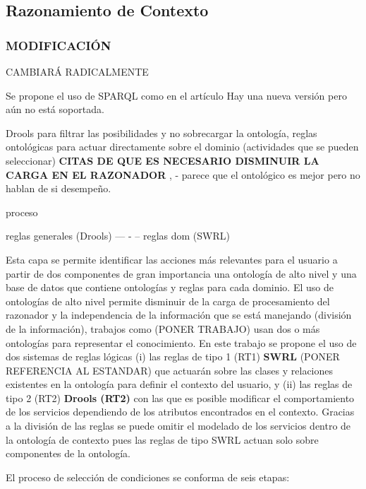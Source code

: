 \subsection{Razonamiento de Contexto}
\label{subsec:Prop_Razonamiento}


\subsubsection{MODIFICACIÓN}

CAMBIARÁ RADICALMENTE

Se propone el uso de SPARQL como en el artículo \cite{Meditskos2013, Meditskos2016}
Hay una nueva versión pero aún no está soportada.


Drools para filtrar las posibilidades y no sobrecargar la ontología, reglas ontológicas para actuar directamente sobre el dominio (actividades que se pueden seleccionar) \textbf{CITAS DE QUE ES NECESARIO DISMINUIR LA CARGA EN EL RAZONADOR} \cite{Ordonez2016}, \cite{Hille} - parece que el ontológico es mejor pero no hablan de si desempeño.

proceso 

reglas generales (Drools) --- - -- reglas dom (SWRL)

Esta capa se permite identificar las acciones más relevantes para el usuario a partir de dos componentes de gran importancia una ontología de alto nivel y una base de datos que contiene ontologías y reglas para cada dominio. El uso de ontologías de alto nivel permite disminuir de la carga de procesamiento del razonador y la independencia de la información que se está manejando (división de la información), trabajos como (PONER TRABAJO) usan dos o más ontologías para representar el conocimiento. En este trabajo se propone el uso de dos sistemas de reglas lógicas (i) las reglas de tipo 1 (RT1) \textbf{SWRL} (PONER REFERENCIA AL ESTANDAR) que actuarán sobre las clases y relaciones existentes en la ontología para definir el contexto del usuario, y (ii) las reglas de tipo 2 (RT2) \textbf{Drools (RT2)} con las que es posible modificar el comportamiento de los servicios dependiendo de los atributos encontrados en el contexto. Gracias a la división de las reglas se puede omitir el modelado de los servicios dentro de la ontología de contexto pues las reglas de tipo SWRL actuan solo sobre componentes de la ontología.

El proceso de selección de condiciones se conforma de seis etapas: 

